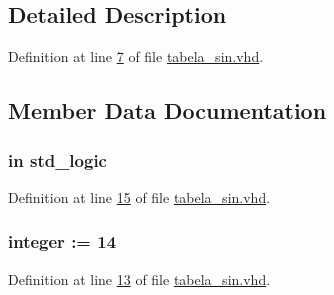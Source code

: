 \subsection{Detailed Description}


Definition at line \hyperlink{tabela__sin_8vhd_source_l00007}{7} of file \hyperlink{tabela__sin_8vhd_source}{tabela\+\_\+sin.\+vhd}.



\subsection{Member Data Documentation}
\hypertarget{classtabela__sin_a4a4609c199d30b3adebbeb3a01276ec5}{}
\subsubsection[{clk}]{ {\bfseries \textcolor{keywordflow}{in}\textcolor{vhdlchar}{ }} {\bfseries \textcolor{comment}{std\+\_\+logic}\textcolor{vhdlchar}{ }} \hspace{0.3cm}{\ttfamily [Port]}}\label{classtabela__sin_a4a4609c199d30b3adebbeb3a01276ec5}


Definition at line \hyperlink{tabela__sin_8vhd_source_l00015}{15} of file \hyperlink{tabela__sin_8vhd_source}{tabela\+\_\+sin.\+vhd}.

\hypertarget{classtabela__sin_aac2d6825f96b21ae984648cc93554339}{}
\subsubsection[{F}]{ {\bfseries \textcolor{vhdlchar}{ }} {\bfseries \textcolor{comment}{integer}\textcolor{vhdlchar}{ }\textcolor{vhdlchar}{ }\textcolor{vhdlchar}{\+:}\textcolor{vhdlchar}{=}\textcolor{vhdlchar}{ }\textcolor{vhdlchar}{ } \textcolor{vhdldigit}{14} \textcolor{vhdlchar}{ }} \hspace{0.3cm}{\ttfamily [Generic]}}\label{classtabela__sin_aac2d6825f96b21ae984648cc93554339}


Definition at line \hyperlink{tabela__sin_8vhd_source_l00013}{13} of file \hyperlink{tabela__sin_8vhd_source}{tabela\+\_\+sin.\+vhd}.

\hypertarget{classtabela__sin_aad86249c80e8c1e7ee1c4748aba748e3}{}

